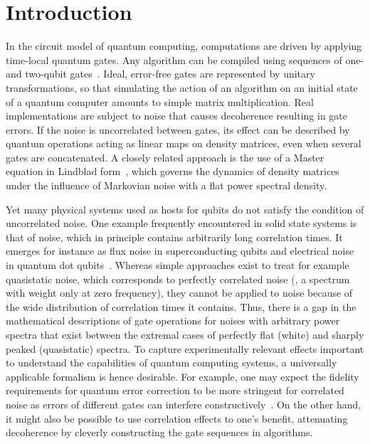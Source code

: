 \chapter{Introduction}\label{ch:ff:introduction}
In the circuit model of quantum computing, computations are driven by applying time-local quantum gates.
Any algorithm can be compiled using sequences of one- and two-qubit gates~\cite{DiVincenzo1995}.
Ideal, error-free gates are represented by unitary transformations, so that simulating the action of an algorithm on an initial state of a quantum computer amounts to simple matrix multiplication.
Real implementations are subject to noise that causes decoherence resulting in gate errors.
If the noise is uncorrelated between gates, its effect can be described by quantum operations acting as linear maps on density matrices, even when several gates are concatenated.
A closely related approach is the use of a Master equation in Lindblad form~\cite{Lindblad1976}, which governs the dynamics of density matrices under the influence of Markovian noise with a flat power spectral density.

Yet many physical systems used as hosts for qubits do not satisfy the condition of uncorrelated noise.
One example frequently encountered in solid state systems is that of \oneoverf noise, which in principle contains arbitrarily long correlation times.
It emerges for instance as flux noise in superconducting qubits and electrical noise in quantum dot qubits~\cite{Brownnutt2015,Kumar2016,Yoneda2018,Paladino2014}.
Whereas simple approaches exist to treat for example quasistatic noise, which corresponds to perfectly correlated noise (\ie, a spectrum with weight only at zero frequency), they cannot be applied to \oneoverf noise because of the wide distribution of correlation times it contains.
Thus, there is a gap in the mathematical descriptions of gate operations for noises with arbitrary power spectra that exist between the extremal cases of perfectly flat (white) and sharply peaked (quasistatic) spectra.
To capture experimentally relevant effects important to understand the capabilities of quantum computing systems, a universally applicable formalism is hence desirable.
For example, one may expect the fidelity requirements for quantum error correction to be more stringent for correlated noise as errors of different gates can interfere constructively~\cite{Ng2009}.
On the other hand, it might also be possible to use correlation effects to one's benefit, attenuating decoherence by cleverly constructing the gate sequences in algorithms.

